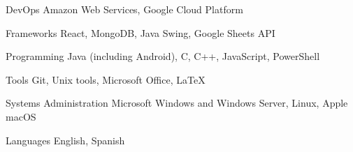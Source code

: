 

\begin{cvskills}

  \cvskill
    {DevOps} %
    {Amazon Web Services, Google Cloud Platform} %

  \cvskill
    {Frameworks} %
    {React, MongoDB, Java Swing, Google Sheets API} %

  \cvskill
    {Programming} %
    {Java (including Android), C, C++, JavaScript, PowerShell} %
    
  \cvskill
    {Tools} %
    {Git, Unix tools, Microsoft Office, LaTeX} %
    
  \cvskill
    {Systems Administration} %
    {Microsoft Windows and Windows Server, Linux, Apple macOS} %

  \cvskill
    {Languages} %
    {English, Spanish} %

\end{cvskills}
